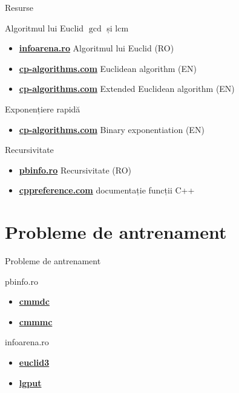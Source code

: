﻿\documentclass{beamer}
\begin{document}
\begin{frame}{Resurse}
  \begin{block}{Algoritmul lui Euclid \textemdash{} $\gcd$ și $\text{lcm}$}
    \begin{itemize}
      \item \href{https://www.infoarena.ro/algoritmul-lui-euclid}{\textbf{infoarena.ro}} \textemdash{} Algoritmul lui Euclid (RO)
      \item \href{https://cp-algorithms.com/algebra/euclid-algorithm.html}{\textbf{cp-algorithms.com}} \textemdash{} Euclidean algorithm (EN)
      \item \href{https://cp-algorithms.com/algebra/extended-euclid-algorithm.html}{\textbf{cp-algorithms.com}} \textemdash{} Extended Euclidean algorithm (EN)
    \end{itemize}
  \end{block}
  \begin{block}{Exponențiere rapidă}
    \begin{itemize}
      \item \href{https://cp-algorithms.com/algebra/binary-exp.html}{\textbf{cp-algorithms.com}} \textemdash{} Binary exponentiation (EN)
    \end{itemize}
  \end{block}
  \begin{block}{Recursivitate}
    \begin{itemize}
      \item \href{https://www.pbinfo.ro/articole/3873/recursivitate}{\textbf{pbinfo.ro}} \textemdash{} Recursivitate (RO)
      \item \href{https://cppreference.com}{\textbf{cppreference.com}} \textemdash{} documentație funcții C++
    \end{itemize}
  \end{block}
\end{frame}

\section{Probleme de antrenament}

\begin{frame}{Probleme de antrenament}
  \begin{block}{pbinfo.ro}
    \begin{itemize}
      \item \href{https://www.pbinfo.ro/probleme/58/cmmdc}{\textbf{cmmdc}}
      \item \href{https://www.pbinfo.ro/probleme/59/cmmmc}{\textbf{cmmmc}}
    \end{itemize}
  \end{block}
  \begin{block}{infoarena.ro}
    \begin{itemize}
      \item \href{https://www.infoarena.ro/problema/euclid3}{\textbf{euclid3}}
      \item \href{https://infoarena.ro/problema/lgput}{\textbf{lgput}}
    \end{itemize}
  \end{block}
\end{frame}
\end{document}

